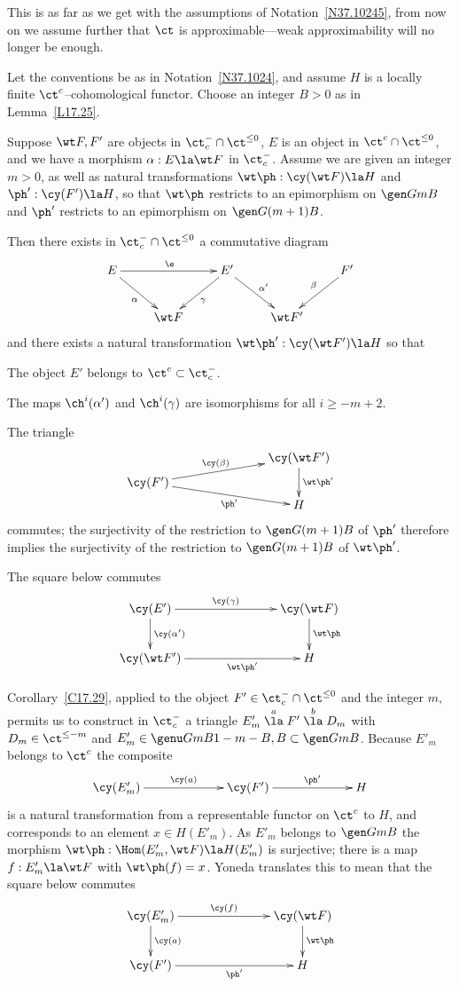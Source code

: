 \documentclass[11pt]{amsart}
\begin{document}
This is as far as we get with the
assumptions of Notation~\ref{N37.10245},
from now on we assume further
that $\ct$ is approximable---weak approximability will no
longer be enough.
\entn


Let the conventions be as in Notation~\ref{N37.1024}, 
and assume
$H$ is a locally finite $\ct^c$--cohomological functor.
Choose an integer $B>0$ as in
Lemma~\ref{L17.25}.

Suppose $\wt F,F'$ are objects in $\ct^-_c\cap\ct^{\leq0}$,
$E$ is an object in $\ct^c\cap\ct^{\leq0}$, and we have a morphism
$\alpha:E\la \wt F$ in $\ct^-_c$.
Assume we are given an integer $m>0$, as
well as natural transformations
$\wt\ph:\cy(\wt F)\la H$ and
$\ph':\cy(F')\la H$,
so that $\wt\ph$ restricts to an epimorphism on $\gen G{mB}$
and $\ph'$ restricts to an epimorphism on $\gen G{(m+1)B}$.


Then there exists in $\ct^-_c\cap\ct^{\leq0}$ a commutative diagram
\[\xymatrix{
E\ar[rr]^{\e}\ar[dr]_{\alpha}&  &\ar[dl]^{\gamma} E'\ar[dr]^{\alpha'} & & F'\ar[dl]_-{\beta} \\
& \wt F &                 & \wt F'
}\]
and there exists a natural transformation
$\wt\ph':\cy(\wt F')\la H$
so that
\be
\item
  The object $E'$ belongs to $\ct^c\subset\ct^-_c$.
\item
  The maps $\ch^i(\alpha')$ and $\ch^i(\gamma)$ are
  isomorphisms for all $i\geq-m+2$. 
\item
  The triangle 
\[\xymatrix@C+50pt@R-20pt{
    & \cy(\wt F') \ar[dd]^{\wt\ph'}\\
  \cy(F') \ar[rd]_-{\ph'}
  \ar[ur]^-{\cy(\beta)} & \\
  & H
}\]
  commutes; the surjectivity of the restriction to $\gen G{(m+1)B}$
  of $\ph'$ therefore implies the surjectivity of the
  restriction to $\gen G{(m+1)B}$
  of $\wt\ph'$.
\item
  The square below commutes
  \[\xymatrix@C+50pt{
    \cy(E') \ar[r]^-{\cy(\gamma)}
    \ar[d]^-{\cy(\alpha')}& \cy(\wt F) \ar[d]^{\wt\ph}\\
  \cy(\wt F') \ar[r]_-{\wt\ph'}  & H
}\]
\setcounter{enumiv}{\value{enumi}}
\ee
\elem

\prf
Corollary~\ref{C17.29}, applied to the object $F'\in\ct^-_c\cap\ct^{\leq0}$
and the integer $m$, permits us to construct in $\ct^-_c$ a triangle
$E'_m\stackrel a\la F'\stackrel b\la D_m$ with $D_m\in\ct^{\leq-m}$ and
$E'_m\in\genu G{mB}{1-m-B,B}\subset\gen G{mB}$.
Because $E'_m$ belongs to $\ct^c$ the
composite 
\[\xymatrix@C+40pt{
\cy(E'_m)\ar[r]^-{\cy(a)} &
  \cy(F')\ar[r]^-{\ph'} & H
}\]
is a natural transformation from a representable functor
on $\ct^c$ to $H$, and corresponds to an element $x\in H(E'_m)$.
As $E'_m$ belongs to $\gen G{mB}$ 
the morphism $\wt\ph:\Hom(E'_m,\wt F)\la H(E'_m)$ is
surjective; there is a map $f:E'_m\la \wt F$ with
$\wt\ph(f)=x$. Yoneda translates this to mean that the 
square below commutes
  \[\xymatrix@C+50pt{
    \cy(E'_m) \ar[r]^-{\cy(f)}
    \ar[d]^-{\cy(a)}& \cy(\wt F) \ar[d]^{\wt\ph}\\
  \cy(F') \ar[r]_-{\ph'}  & H
}\]
\end{document}
